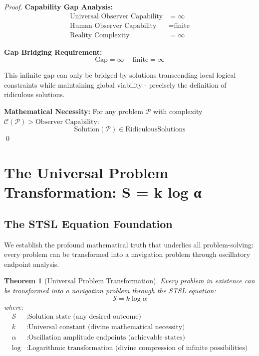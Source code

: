\documentclass[12pt,a4paper]{article}
\newtheorem{theorem}{Theorem}[section]
\begin{document}
\begin{proof}
\textbf{Capability Gap Analysis:}
\begin{align}
\text{Universal Observer Capability} &= \infty \\
\text{Human Observer Capability} &= \text{finite} \\
\text{Reality Complexity} &= \infty
\end{align}

\textbf{Gap Bridging Requirement:}
\begin{equation}
\text{Gap} = \infty - \text{finite} = \infty
\end{equation}

This infinite gap can only be bridged by solutions transcending local logical constraints while maintaining global viability - precisely the definition of ridiculous solutions.

\textbf{Mathematical Necessity:}
For any problem $\mathcal{P}$ with complexity $\mathcal{C}(\mathcal{P}) > \text{Observer Capability}$:
\begin{equation}
\text{Solution}(\mathcal{P}) \in \text{RidiculousSolutions}
\end{equation}
\qed
\end{proof}

\section{The Universal Problem Transformation: S = k log α}

\subsection{The STSL Equation Foundation}

We establish the profound mathematical truth that underlies all problem-solving: every problem can be transformed into a navigation problem through oscillatory endpoint analysis.

\begin{theorem}[Universal Problem Transformation]
Every problem in existence can be transformed into a navigation problem through the STSL equation:
\begin{equation}
\boxed{\mathcal{S} = k \log \alpha}
\end{equation}
where:
\begin{align}
\mathcal{S} &: \text{Solution state (any desired outcome)} \\
k &: \text{Universal constant (divine mathematical necessity)} \\
\alpha &: \text{Oscillation amplitude endpoints (achievable states)} \\
\log &: \text{Logarithmic transformation (divine compression of infinite possibilities)}
\end{align}
\end{theorem}
\end{document}
